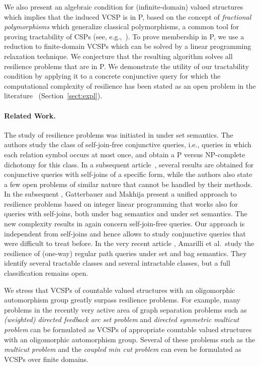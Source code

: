 \documentclass[nonacm]{acmart}
\begin{document}
We also present an algebraic condition for (infinite-domain) valued structures which implies that the induced VCSP is in P, based on the concept of \emph{fractional polymorphisms} which generalize classical polymorphisms, a common tool for proving tractability of CSPs (see, e.g.,~\cite{CohenCooperJeavonsVCSP}). 
To prove membership in P, we use a reduction to finite-domain VCSPs which can be solved by a linear programming relaxation technique. We conjecture that the resulting algorithm solves all resilience problems that are in P. 
We demonstrate the utility of our  tractability condition by
applying it to a concrete conjunctive query for which the computational complexity of resilience has been stated as an open problem in the literature~\cite{NewResilience} (Section~\ref{sect:expl}). 
 
\paragraph{Related Work.}
The study of resilience problems was initiated in \cite{Resilience} under set semantics. The authors study the class of self-join-free conjunctive queries, i.e., queries in which each relation symbol occurs at most once, and obtain a P versus NP-complete dichotomy for this class. In a subsequent article~\cite{NewResilience}, several results are obtained for conjunctive queries with self-joins of a specific form, while the authors also state a few open problems of similar nature that cannot be handled by their methods. In the subsequent \cite{LatestResilience}, Gatterbauer and Makhija present a unified approach to resilience problems based on integer linear programming that works also for queries with self-joins, both under bag semantics and under set semantics. The new complexity results in \cite{LatestResilience} again concern self-join-free queries. Our approach is independent from self-joins and hence allows to study conjunctive queries that were difficult to treat before. In the very recent article \cite{amarilli2024resilienceregularpathqueries}, Amarilli et al.\ study the resilience of (one-way) regular path queries under set and bag semantics. They identify several 
tractable classes and several intractable classes, but a full classification remains open.

We stress that VCSPs of countable valued structures with an oligomorphic automorphism group greatly surpass resilience problems. For example, many problems in the recently very active area of graph separation problems \cite{KPW22,KKPW21} such as \emph{(weighted) directed feedback arc set problem} and \emph{directed symmetric multicut problem} can be formulated as VCSPs of appropriate countable valued structures with an oligomorphic automorphism group. Several of these problems such as the \emph{multicut problem} and the \emph{coupled min cut problem} can even be formulated as VCSPs over finite domains.
 
\end{document}
